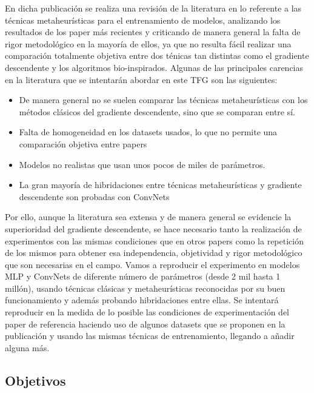 En dicha publicación se realiza una revisión de la literatura en lo referente a las técnicas metaheurísticas para el entrenamiento de modelos, analizando los resultados de los paper más recientes y criticando de manera general la falta de rigor metodológico en la mayoría de ellos, ya que no resulta fácil realizar una comparación totalmente objetiva entre dos ténicas tan distintas como el gradiente descendente y los algoritmos bio-inspirados. Algunas de las principales carencias en la literatura que se intentarán abordar en este TFG son las siguientes:

\begin{itemize}

\item De manera general no se suelen comparar las técnicas metaheurísticas con los métodos clásicos del gradiente descendente, sino que se comparan entre sí.

\item Falta de homogeneidad en los datasets usados, lo que no permite una comparación objetiva entre papers

\item Modelos no realistas que usan unos pocos de miles de parámetros.

\item La gran mayoría de hibridaciones entre técnicas metaheurísticas y gradiente descendente son probadas con ConvNets

\end{itemize}

Por ello, aunque la literatura sea extensa y de manera general se evidencie la superioridad del gradiente descendente, se hace necesario tanto la realización de experimentos con las mismas condiciones que en otros papers como la repetición de los mismos para obtener esa independencia, objetividad y rigor metodológico que son necesarias en el campo. Vamos a reproducir el experimento en modelos MLP y ConvNets de diferente número de parámetros (desde 2 mil hasta 1 millón), usando técnicas clásicas y metaheurísticas reconocidas por su buen funcionamiento y además probando hibridaciones entre ellas. Se intentará reproducir en la medida de lo posible las condiciones de experimentación del paper de referencia haciendo uso de algunos datasets que se proponen en la publicación y usando las mismas técnicas de entrenamiento, llegando a añadir alguna más.



\subsection{Objetivos}

